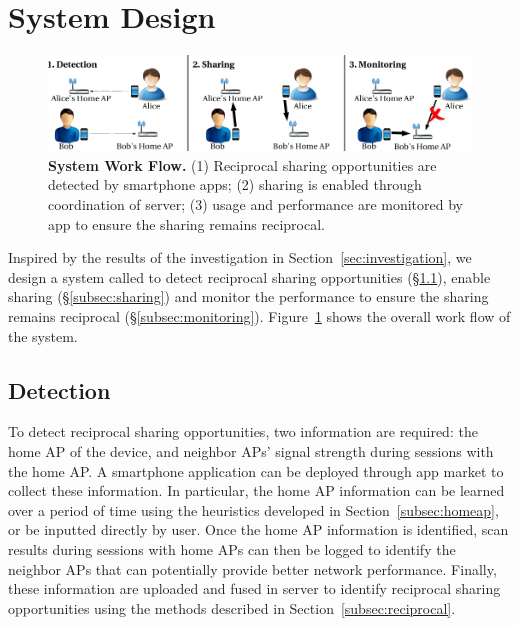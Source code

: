 \section{System Design}
\label{sec:design}

\begin{figure}[t]
  \centering
  \includegraphics[width=\textwidth]{./figures/design.pdf}
  \caption{\textbf{\wisefi{} System Work Flow.} (1) Reciprocal sharing
    opportunities are detected by \wisefi{} smartphone apps; (2) \wifi{} sharing
    is enabled through coordination of \wisefi{} server; (3) \wifi{} usage and
    performance are monitored by \wisefi{} app to ensure the sharing remains
  reciprocal.}
  \label{fig:design}
\end{figure}

Inspired by the results of the investigation in Section~\ref{sec:investigation},
we design a system called \wisefi{} to detect reciprocal sharing
opportunities (\S\ref{subsec:detection}), enable \wifi{} sharing
(\S\ref{subsec:sharing}) and monitor the \wifi{} performance to ensure the
sharing remains reciprocal (\S\ref{subsec:monitoring}). Figure~\ref{fig:design}
shows the overall work flow of the \wisefi{} system.

\subsection{Detection}
\label{subsec:detection}

To detect reciprocal sharing opportunities, two information are required: the
home AP of the device, and neighbor APs' signal strength during \wifi{} sessions
with the home AP. A smartphone application can be deployed through app market to
collect these information. In particular, the home AP information can be learned
over a period of time using the heuristics developed in
Section~\ref{subsec:homeap}, or be inputted directly by user. Once the home AP
information is identified, \wifi{} scan results during sessions with home APs
can then be logged to identify the neighbor APs that can potentially provide
better network performance. Finally, these information are uploaded and fused in
\wisefi{} server to identify reciprocal sharing opportunities using the methods
described in Section~\ref{subsec:reciprocal}.


